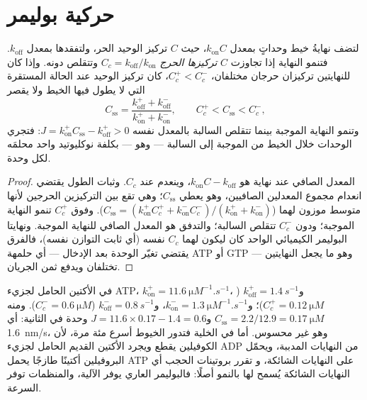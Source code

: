 \section{حركية بوليمر}

\begin{theorem}\label{thm:b3:cytoskeleton-motility:treadmilling}
لتضف نهايةُ خيط وحداتٍ بمعدل $k_{\text{on}}C$، حيث
$C$ تركيز الوحيد الحر، ولتفقدها بمعدل
$k_{\text{off}}$. فتنمو النهاية إذا تجاوزت $C$ \emph{تركيزها
الحرج} $C_{c} = k_{\text{off}}/k_{\text{on}}$ وتتقلص دونه.
وإذا كان للنهايتين تركيزان حرجان مختلفان، $C_{c}^{+}
< C_{c}^{-}$، كان تركيز الوحيد عند الحالة المستقرة التي لا
يطول فيها الخيط ولا يقصر
\[
C_{\text{ss}} = \frac{k_{\text{off}}^{+} + k_{\text{off}}^{-}}
{k_{\text{on}}^{+} + k_{\text{on}}^{-}},
\qquad C_{c}^{+} < C_{\text{ss}} < C_{c}^{-},
\]
وتنمو النهاية الموجبة بينما تتقلص السالبة بالمعدل نفسه
$J = k_{\text{on}}^{+}C_{\text{ss}} - k_{\text{off}}^{+} > 0$: فتجري الوحدات
خلال الخيط من الموجبة إلى السالبة --- وهو \emph{}
--- بكلفة نوكليوتيد واحد محلمَه لكل وحدة.
\end{theorem}
\begin{proof}
المعدل الصافي عند نهاية هو $k_{\text{on}}C - k_{\text{off}}$، وينعدم عند
$C_{c}$. وثبات الطول يقتضي انعدام مجموع المعدلين
الصافيين، وهو يعطي $C_{\text{ss}}$؛ وهي تقع بين التركيزين
الحرجين لأنها متوسط موزون لهما ($C_{\text{ss}} =
(k_{\text{on}}^{+}C_{c}^{+} + k_{\text{on}}^{-}C_{c}^{-})/(k_{\text{on}}^{+}
+ k_{\text{on}}^{-})$). وفوق $C_{c}^{+}$ تنمو النهاية الموجبة؛ ودون
$C_{c}^{-}$ تتقلص السالبة؛ والتدفق هو المعدل الصافي للنهاية الموجبة.
ونهايتا البوليمر الكيميائي الواحد كان ليكون لهما $C_{c}$ نفسه (أي
ثابت التوازن نفسه)، فالفرق يقتضي تغيّر الوحدة
بعد الإدخال --- أي حلمهة ATP أو GTP --- وهو ما
يجعل النهايتين تختلفان ويدفع ثمن الجريان.
\end{proof}

\begin{example}\label{ex:b3:cytoskeleton-motility:actin-numbers}
في الأكتين الحامل لجزيء ATP، $k_{\text{on}}^{+} = \qty{11.6}{\micro M^{-1}.s^{-1}}$،
و$k_{\text{off}}^{+} = \qty{1.4}{s^{-1}}$ ($C_{c}^{+} = \qty{0.12}{\micro
M}$)؛ و$k_{\text{on}}^{-} = \qty{1.3}{\micro M^{-1}.s^{-1}}$،
و$k_{\text{off}}^{-} = \qty{0.8}{s^{-1}}$ ($C_{c}^{-} = \qty{0.6}{\micro
M}$). ومنه $C_{\text{ss}} = 2.2/12.9 = \qty{0.17}{\micro M}$ و$J =
11.6\times 0.17 - 1.4 = 0.6$ وحدة في الثانية: أي \qty{1.6}{nm/s}،
وهو غير محسوس. أما في الخلية فتدور الخيوط أسرع مئة مرة،
لأن الكوفيلين يقطع ويجرد الأكتين القديم الحامل لجزيء ADP من
النهايات المدببة، ويحمّل البروفيلين أكتينًا طازجًا يحمل ATP على النهايات الشائكة، و
تقرر بروتينات الحجب أي النهايات الشائكة يُسمح لها بالنمو أصلًا: فالبوليمر
العاري يوفر الآلية، والمنظمات توفر السرعة.
\end{example}

